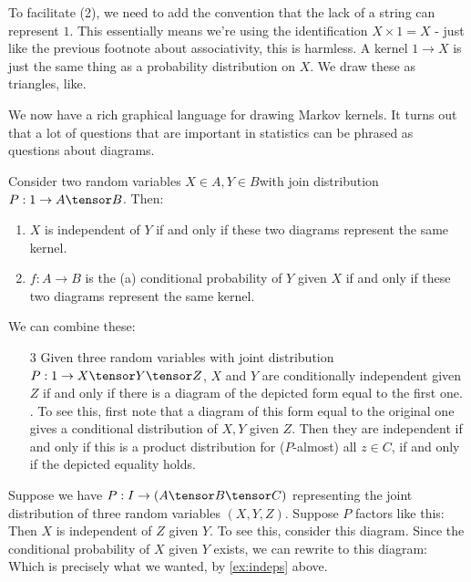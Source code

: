 \documentclass{article}
\begin{document}
To facilitate (2), we need to add the convention that the lack of a string can represent $1$.
This essentially means we're using the identification $X \times 1 = X$ - just like the previous footnote about associativity, this is harmless.
A kernel $1 \to X$ is just the same thing as a probability distribution on $X$. We draw these as triangles, like.

We now have a rich graphical language for drawing Markov kernels.
It turns out that a lot of questions that are important in statistics can be phrased as questions about diagrams.
\begin{example}
    Consider two random variables $X\in A,Y\in B$with join distribution $P: 1 \to A \tensor B$. Then:
    \begin{enumerate}
        \item $X$ is independent of $Y$ if and only if these two diagrams represent the same kernel.
        \item $f:A \to B$ is the (a) conditional probability of $Y$ given $X$ if and only if these two diagrams represent the same kernel.
    \end{enumerate}
    We can combine these:
    \begin{enumerate}
        \item[3] Given three random variables with joint distribution $P: 1 \to X \tensor Y \tensor Z$, $X$ and $Y$ are conditionally independent given $Z$ if and only if there is a diagram of the depicted form equal to the first one. .
        To see this, first note that a diagram of this form equal to the original one gives a conditional distribution of $X,Y$ given $Z$.
        Then they are independent if and only if this is a product distribution for ($P$-almost) all $z\in C$, if and only if the depicted equality holds.
    \end{enumerate}
\label{ex:indeps}
\end{example}
\begin{example}
    Suppose we have $P: I \to (A \tensor B \tensor C)$ representing the joint distribution of three random variables $(X,Y,Z)$.
    Suppose $P$ factors like this:
    Then $X$ is independent of $Z$ given $Y$.
    To see this, consider this diagram.
    Since the conditional probability of $X$ given $Y$ exists, we can rewrite to this diagram:
    Which is precisely what we wanted, by \cref{ex:indeps} above.
\end{example}
\end{document}
